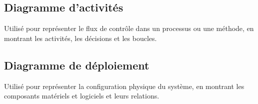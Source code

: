 \subsection{Diagramme d'activités}\label{subsec:diagrammes-d-activites}
Utilisé pour représenter le flux de contrôle dans un processus ou une méthode, en montrant les activités, les décisions et les boucles.
\subsection{Diagramme de déploiement}\label{subsec:diagrammes-de-deploiement}
Utilisé pour représenter la configuration physique du système, en montrant les composants matériels et logiciels et leurs relations.

